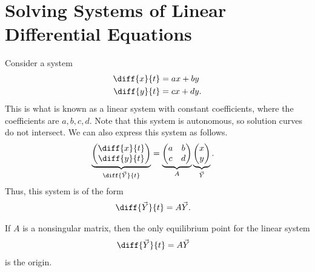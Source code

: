 \documentclass[10pt]{mypackage}
\begin{document}
\section{Solving Systems of Linear Differential Equations}%
Consider a system
\begin{align*}
  \diff{x}{t} &= ax + by\\
  \diff{y}{t} &= cx + dy.
\end{align*}
This is what is known as a linear system with constant coefficients, where the coefficients are $a,b,c,d$. Note that this system is autonomous, so solution curves do not intersect. We can also express this system as follows.
\begin{align*}
  \underbrace{\begin{pmatrix}\diff{x}{t}\\\diff{y}{t}\end{pmatrix}}_{\diff{\vec{Y}}{t}} &= \underbrace{\begin{pmatrix}a & b \\ c & d\end{pmatrix}}_{A} \underbrace{\begin{pmatrix}x\\y\end{pmatrix}}_{\vec{Y}}.
\end{align*}
Thus, this system is of the form
\begin{align*}
  \diff{\vec{Y}}{t} &= A\vec{Y}.
\end{align*}
\begin{theorem}
  If $A$ is a nonsingular matrix, then the only equilibrium point for the linear system
  \begin{align*}
    \diff{\vec{Y}}{t} &= A\vec{Y}
  \end{align*}
  is the origin.
\end{theorem}
\end{document}
